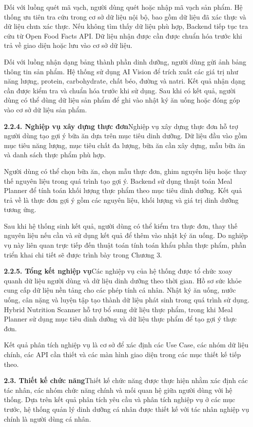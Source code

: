 Đối với luồng quét mã vạch, người dùng quét hoặc nhập mã vạch sản phẩm. Hệ thống ưu tiên tra cứu trong cơ sở dữ liệu nội bộ, bao gồm dữ liệu đã xác thực và dữ liệu chưa xác thực. Nếu không tìm thấy dữ liệu phù hợp, Backend tiếp tục tra cứu từ Open Food Facts API. Dữ liệu nhận được cần được chuẩn hóa trước khi trả về giao diện hoặc lưu vào cơ sở dữ liệu.

Đối với luồng nhận dạng bảng thành phần dinh dưỡng, người dùng gửi ảnh bảng thông tin sản phẩm. Hệ thống sử dụng AI Vision để trích xuất các giá trị như năng lượng, protein, carbohydrate, chất béo, đường và natri. Kết quả nhận dạng cần được kiểm tra và chuẩn hóa trước khi sử dụng. Sau khi có kết quả, người dùng có thể dùng dữ liệu sản phẩm để ghi vào nhật ký ăn uống hoặc đóng góp vào cơ sở dữ liệu sản phẩm.

\textbf{2.2.4. Nghiệp vụ xây dựng thực đơn}Nghiệp vụ xây dựng thực đơn hỗ trợ người dùng tạo gợi ý bữa ăn dựa trên mục tiêu dinh dưỡng. Dữ liệu đầu vào gồm mục tiêu năng lượng, mục tiêu chất đa lượng, bữa ăn cần xây dựng, mẫu bữa ăn và danh sách thực phẩm phù hợp.

Người dùng có thể chọn bữa ăn, chọn mẫu thực đơn, ghim nguyên liệu hoặc thay thế nguyên liệu trong quá trình tạo gợi ý. Backend sử dụng thuật toán Meal Planner để tính toán khối lượng thực phẩm theo mục tiêu dinh dưỡng. Kết quả trả về là thực đơn gợi ý gồm các nguyên liệu, khối lượng và giá trị dinh dưỡng tương ứng.

Sau khi hệ thống sinh kết quả, người dùng có thể kiểm tra thực đơn, thay thế nguyên liệu nếu cần và sử dụng kết quả để thêm vào nhật ký ăn uống. Do nghiệp vụ này liên quan trực tiếp đến thuật toán tính toán khẩu phần thực phẩm, phần triển khai chi tiết sẽ được trình bày trong Chương 3.

\textbf{2.2.5. Tổng kết nghiệp vụ}Các nghiệp vụ của hệ thống được tổ chức xoay quanh dữ liệu người dùng và dữ liệu dinh dưỡng theo thời gian. Hồ sơ sức khỏe cung cấp dữ liệu nền tảng cho các phép tính cá nhân. Nhật ký ăn uống, nước uống, cân nặng và luyện tập tạo thành dữ liệu phát sinh trong quá trình sử dụng. Hybrid Nutrition Scanner hỗ trợ bổ sung dữ liệu thực phẩm, trong khi Meal Planner sử dụng mục tiêu dinh dưỡng và dữ liệu thực phẩm để tạo gợi ý thực đơn.

Kết quả phân tích nghiệp vụ là cơ sở để xác định các Use Case, các nhóm dữ liệu chính, các API cần thiết và các màn hình giao diện trong các mục thiết kế tiếp theo.

\textbf{2.3. Thiết kế chức năng}Thiết kế chức năng được thực hiện nhằm xác định các tác nhân, các nhóm chức năng chính và mối quan hệ giữa người dùng với hệ thống. Dựa trên kết quả phân tích yêu cầu và phân tích nghiệp vụ ở các mục trước, hệ thống quản lý dinh dưỡng cá nhân được thiết kế với tác nhân nghiệp vụ chính là người dùng cá nhân.


